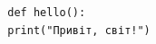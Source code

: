 \documentclass{article}
\begin{document}
	
	\begin{verbatim}
		def hello():
		print("Привіт, світ!")
	\end{verbatim}
	
\end{document}
